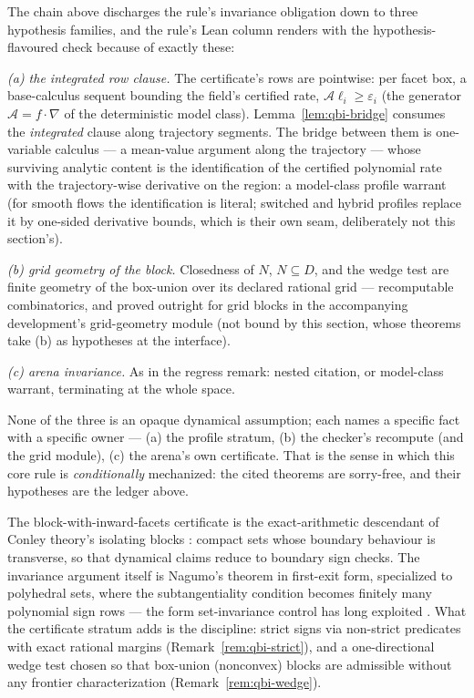 \begin{bremark}
\label{rem:qbi-ledger}
The chain above discharges the rule's invariance obligation down to
three hypothesis families, and the rule's Lean column renders with the
hypothesis-flavoured check because of exactly these:

\emph{(a) the integrated row clause.} The certificate's rows are
pointwise: per facet box, a base-calculus sequent bounding the field's
certified rate, $\mathcal{A}\ell_i \geq \varepsilon_i$ (the generator
$\mathcal{A} = f \cdot \nabla$ of the deterministic model class).
Lemma~\ref{lem:qbi-bridge} consumes the \emph{integrated} clause along
trajectory segments. The bridge between them is one-variable calculus
--- a mean-value argument along the trajectory --- whose surviving
analytic content is the identification of the certified polynomial
rate with the trajectory-wise derivative on the region: a model-class
profile warrant (for smooth flows the identification is literal;
switched and hybrid profiles replace it by one-sided derivative
bounds, which is their own seam, deliberately not this section's).

\emph{(b) grid geometry of the block.} Closedness of $N$,
$N \subseteq D$, and the wedge test are finite geometry of the
box-union over its declared rational grid --- recomputable
combinatorics, and proved outright for grid blocks in the accompanying
development's grid-geometry module (not bound by this section, whose
theorems take (b) as hypotheses at the interface).

\emph{(c) arena invariance.} As in the regress remark: nested
citation, or model-class warrant, terminating at the whole space.

None of the three is an opaque dynamical assumption; each names a
specific fact with a specific owner --- (a) the profile stratum, (b)
the checker's recompute (and the grid module), (c) the arena's own
certificate. That is the sense in which this core rule is
\emph{conditionally} mechanized: the cited theorems are sorry-free,
and their hypotheses are the ledger above.
\end{bremark}

\begin{bremark}
The block-with-inward-facets certificate is the exact-arithmetic
descendant of Conley theory's isolating blocks
\cite{conleyeaston1971}: compact sets whose boundary behaviour is
transverse, so that dynamical claims reduce to boundary sign checks.
The invariance argument itself is Nagumo's theorem
\cite{nagumo1942} in first-exit form, specialized to polyhedral sets,
where the subtangentiality condition becomes finitely many polynomial
sign rows --- the form set-invariance control has long exploited
\cite{blanchini1999}. What the certificate stratum adds is the
discipline: strict signs via non-strict predicates with exact rational
margins (Remark~\ref{rem:qbi-strict}), and a one-directional wedge
test chosen so that box-union (nonconvex) blocks are admissible
without any frontier characterization
(Remark~\ref{rem:qbi-wedge}).
\end{bremark}

